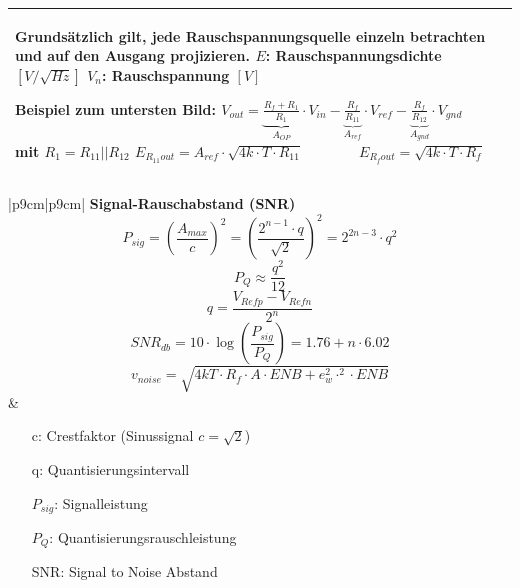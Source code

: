 \begin{longtable}[t]{|p{4cm}|p{13.8cm}|}
{    Grundsätzlich gilt, jede Rauschspannungsquelle einzeln betrachten und auf den Ausgang projizieren. 
    \newline
    \newline
    $E$: Rauschspannungsdichte $[V/\sqrt{Hz}]$ \newline
    $V_n$: Rauschspannung $[V]$ \newline
    
    \textbf{Beispiel zum untersten Bild:} \newline
    $V_{out} = \underbrace{\frac{R_f + R_1}{R_1}}_{A_{OP}} \cdot V_{in} - \underbrace{\frac{R_f}{R_{11}}}_{A_{ref}}
    \cdot V_{ref} - \underbrace{\frac{R_f}{R_{12}}}_{A_{gnd}} \cdot V_{gnd}$ \qquad mit $R_1 = R_{11} || R_{12}$ \newline
    $E_{R_{11}out} = A_{ref} \cdot \sqrt{4k \cdot T \cdot R_{11}} \qquad  \qquad E_{R_fout} = \sqrt{4k \cdot T \cdot R_f}$
    }
    \\ \hline
\end{longtable}    
    
\newpage


\vspace{-2.5\topsep}
\begin{longtable}[t]{|p{9cm}|p{9cm}|}
  \hline  
    \textbf{ Signal-Rauschabstand (SNR)} \\
  \hdashline
    \vspace{-1.5\topsep}
    \[ P_{sig} = \left(\frac{A_{max}}{c}\right)^2=\left(\frac{2^{n-1}\cdot q}{\sqrt 2}\right)^2 = 2^{2n-3}\cdot q^2\]    
    \newline
    \[ P_Q \approx \frac{q^2}{12} \] \newline
    \[ q = \frac{V_{Refp}-V_{Refn}}{2^n} \]  \newline
    \[ SNR_{db} = 10 \cdot \log\left(\frac{P_{sig}}{P_Q}\right) = 1.76+n \cdot 6.02 \]\newline
    \[v_{noise} = \sqrt{4kT\cdot R_f\cdot A\cdot ENB+e_w^2\cdot ^2\cdot ENB}	\]\newline
     &
    \vspace{-1.5\topsep}
    \begin{itemize}
      \item[c:] Crestfaktor (Sinussignal $c=\sqrt 2$)
      \item[q:] Quantisierungsintervall
      \item[$P_{sig}$:] Signalleistung
      \item[$P_Q$:] Quantisierungsrauschleistung
      \item[SNR:] Signal to Noise Abstand
    \end{itemize} \\
  \hline
\end{longtable}
    
    
    